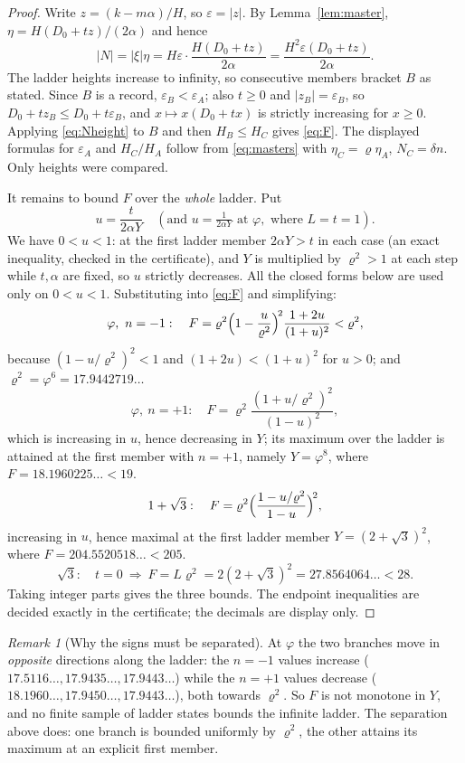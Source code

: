 \documentclass[11pt]{article}
\theoremstyle{definition}
\theoremstyle{remark}
\newtheorem{remark}[theorem]{Remark}
\newcommand{\pr}{\varrho}
\begin{document}
\begin{proof}
Write $z=(k-m\alpha)/H$, so $\varepsilon=|z|$. By Lemma~\ref{lem:master},
$\eta=H(D_0+tz)/(2\alpha)$ and hence
\begin{equation}\label{eq:Nheight}
|N|=|\xi|\eta=H\varepsilon\cdot\frac{H(D_0+tz)}{2\alpha}=\frac{H^2\varepsilon(D_0+tz)}{2\alpha}.
\end{equation}
The ladder heights increase to infinity, so consecutive members bracket $B$ as stated. Since
$B$ is a record, $\varepsilon_B<\varepsilon_A$; also $t\ge0$ and $|z_B|=\varepsilon_B$, so
$D_0+tz_B\le D_0+t\varepsilon_B$, and $x\mapsto x(D_0+tx)$ is strictly increasing for $x\ge0$.
Applying \eqref{eq:Nheight} to $B$ and then $H_B\le H_C$ gives \eqref{eq:F}. The displayed
formulas for $\varepsilon_A$ and $H_C/H_A$ follow from \eqref{eq:masters} with $\eta_C=\pr\eta_A$,
$N_C=\delta n$. Only heights were compared.

It remains to bound $F$ over the \emph{whole} ladder. Put
\[
u=\frac{t}{2\alpha Y}\quad(\text{and }u=\tfrac1{2\alpha Y}\text{ at }\varphi,\text{ where }L=t=1).
\]
We have $0<u<1$: at the first ladder member $2\alpha Y>t$ in each case (an exact inequality,
checked in the certificate), and $Y$ is multiplied by $\pr^2>1$ at each step while $t,\alpha$
are fixed, so $u$ strictly decreases. All the closed forms below are used only on $0<u<1$.
Substituting into \eqref{eq:F} and simplifying:
\[
\varphi,\ n=-1:\quad F=\pr^2\Bigl(1-\frac{u}{\pr^2}\Bigr)^{\!2}\frac{1+2u}{(1+u)^2}<\pr^2,
\]
because $(1-u/\pr^2)^2<1$ and $(1+2u)<(1+u)^2$ for $u>0$; and $\pr^2=\varphi^6=17.9442719\ldots$
\[
\varphi,\ n=+1:\quad F=\pr^2\frac{(1+u/\pr^2)^2}{(1-u)^2},
\]
which is increasing in $u$, hence decreasing in $Y$; its maximum over the ladder is attained at
the first member with $n=+1$, namely $Y=\varphi^8$, where $F=18.1960225\ldots<19$.
\[
1+\sqrt3:\quad F=\pr^2\Bigl(\frac{1-u/\pr^2}{1-u}\Bigr)^{\!2},
\]
increasing in $u$, hence maximal at the first ladder member $Y=(2+\sqrt3)^2$, where
$F=204.5520518\ldots<205$.
\[
\sqrt3:\quad t=0\ \Longrightarrow\ F=L\pr^2=2(2+\sqrt3)^2=27.8564064\ldots<28 .
\]
Taking integer parts gives the three bounds. The endpoint inequalities are decided exactly in
the certificate; the decimals are display only.
\end{proof}

\begin{remark}[Why the signs must be separated]\label{rem:signsep}
At $\varphi$ the two branches move in \emph{opposite} directions along the ladder: the $n=-1$
values increase ($17.5116\ldots,17.9435\ldots,17.9443\ldots$) while the $n=+1$ values decrease
($18.1960\ldots,17.9450\ldots,17.9443\ldots$), both towards $\pr^2$. So $F$ is not monotone in
$Y$, and no finite sample of ladder states bounds the infinite ladder. The separation above
does: one branch is bounded uniformly by $\pr^2$, the other attains its maximum at an explicit
first member.
\end{remark}
\end{document}
